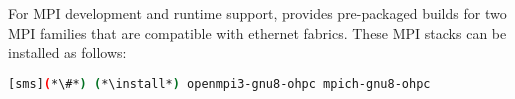 For MPI development and runtime support, \OHPC{} provides pre-packaged builds
for two MPI families that are compatible with ethernet fabrics. These MPI
stacks can be installed as follows:

\begin{lstlisting}[language=bash]
[sms](*\#*) (*\install*) openmpi3-gnu8-ohpc mpich-gnu8-ohpc
\end{lstlisting}





